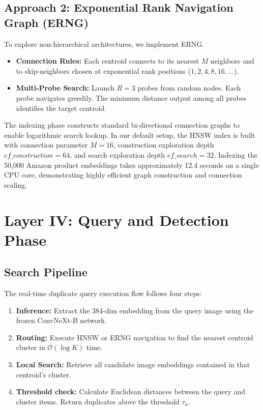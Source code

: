 \documentclass[11pt,a4paper]{article}
\begin{document}
\subsection{Approach 2: Exponential Rank Navigation Graph (ERNG)}
To explore non-hierarchical architectures, we implement ERNG.
\begin{itemize}
    \item \textbf{Connection Rules:} Each centroid connects to its nearest $M$ neighbors and to skip-neighbors chosen at exponential rank positions ($1, 2, 4, 8, 16, \dots$).
    \item \textbf{Multi-Probe Search:} Launch $R = 3$ probes from random nodes. Each probe navigates greedily. The minimum distance output among all probes identifies the target centroid.
\end{itemize}

The indexing phase constructs standard bi-directional connection graphs to enable logarithmic search lookup. In our default setup, the HNSW index is built with connection parameter $M = 16$, construction exploration depth $ef\_construction = 64$, and search exploration depth $ef\_search = 32$. Indexing the 50,000 Amazon product embeddings takes approximately 12.4 seconds on a single CPU core, demonstrating highly efficient graph construction and connection scaling.

\vspace*{0.5\textheight}


\section{Layer IV: Query and Detection Phase}

\subsection{Search Pipeline}
The real-time duplicate query execution flow follows four steps:
\begin{enumerate}
    \item \textbf{Inference:} Extract the 384-dim embedding from the query image using the frozen ConvNeXt-B network.
    \item \textbf{Routing:} Execute HNSW or ERNG navigation to find the nearest centroid cluster in $\mathcal{O}(\log K)$ time.
    \item \textbf{Local Search:} Retrieve all candidate image embeddings contained in that centroid's cluster.
    \item \textbf{Threshold check:} Calculate Euclidean distances between the query and cluster items. Return duplicates above the threshold $\tau_a$.
\end{enumerate}
\end{document}
